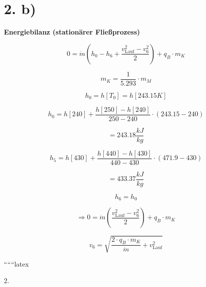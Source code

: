 \section*{2. b)}

\textbf{Energiebilanz (stationärer Fließprozess)}

\[
0 = \dot{m} \left( h_0 - h_6 + \frac{v_{\text{Lauf}}^2 - v_6^2}{2} \right) + q_B \cdot m_K
\]

\[
m_K = \frac{1}{5.293} \cdot m_M
\]

\[
h_0 = h[T_0] = h[243.15 K]
\]

\[
h_0 = h[240] + \frac{h[250] - h[240]}{250 - 240} \cdot (243.15 - 240)
\]

\[
= 243.18 \frac{kJ}{kg}
\]

\[
h_5 = h[430] + \frac{h[440] - h[430]}{440 - 430} \cdot (471.9 - 430)
\]

\[
= 433.37 \frac{kJ}{kg}
\]

\[
h_6 = h_0
\]

\[
\Rightarrow 0 = \dot{m} \left( \frac{v_{\text{Lauf}}^2 - v_6^2}{2} \right) + q_B \cdot m_K
\]

\[
v_6 = \sqrt{\frac{2 \cdot q_B \cdot m_K}{\dot{m}} + v_{\text{Lauf}}^2}
\]

``````latex


2.